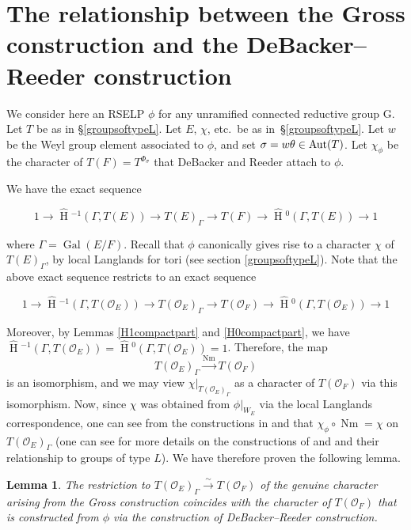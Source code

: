 \documentclass[11pt]{amsart}
\theoremstyle{plain}
\newtheorem{lemma}[theorem]{Lemma}
\newcommand{\HT}[1]{\hat{\HH}{}^{#1}}
\theoremstyle{definition}
\DeclareMathOperator{\Gal}{Gal}
\DeclareMathOperator{\HH}{H}
\DeclareMathOperator{\Nm}{Nm}
\begin{document}
\section{The relationship between the Gross construction and the DeBacker--Reeder construction}\label{grossdebackerreeder}

We consider here an RSELP $\phi$ for any unramified connected
reductive group G.  Let $T$ be as in \S\ref{groupsoftypeL}.  Let $E$,
$\chi$, etc.~be as in~\S\ref{groupsoftypeL}.  Let $w$ be the Weyl
group element associated to $\phi$, and set $\sigma = w \theta\in {\rm Aut}(T)$.
Let $\chi_{\phi}$ be the character of $T(F) = T^{\Phi_{\sigma}}$ that
DeBacker and Reeder attach to $\phi$.

We have the exact sequence

$$1 \rightarrow \HT{-1}(\Gamma, T(E)) \rightarrow T(E)_{\Gamma} \rightarrow T(F)
  \rightarrow \HT{0}(\Gamma, T(E)) \rightarrow 1$$

where $\Gamma = \Gal(E/F)$.  Recall that $\phi$ canonically gives
rise to a character $\chi$ of $T(E)_{\Gamma}$, by local Langlands
for tori (see section \ref{groupsoftypeL}).  Note that the above
exact sequence restricts to an exact sequence

$$1 \rightarrow \HT{-1}(\Gamma, T(\mathcal{O}_E)) \rightarrow T(\mathcal{O}_E)_{\Gamma}
  \rightarrow T(\mathcal{O}_F) \rightarrow \HT{0}(\Gamma, T(\mathcal{O}_E)) \rightarrow 1$$

Moreover, by Lemmas \ref{H1compactpart} and \ref{H0compactpart}, we have
$\HT{-1}(\Gamma, T(\mathcal{O}_E)) = \HT{0}(\Gamma, T(\mathcal{O}_E)) = 1$.
Therefore, the map
$$T(\mathcal{O}_E)_{\Gamma} \xrightarrow{\Nm} T(\mathcal{O}_F)$$
is an isomorphism, and we may view
$\chi|_{T(\mathcal{O}_E)_{\Gamma}}$ as a character of
$T(\mathcal{O}_F)$ via this isomorphism.  Now, since $\chi$ was
obtained from $\phi|_{W_E}$ via the local Langlands correspondence, one can see
from the constructions in \cite{debackerreeder} and \cite{reeder} that 
$\chi_{\phi} \circ \Nm = \chi$ on $T(\mathcal{O}_E)_{\Gamma}$ (one can see
\cite{adrianlansky} for more details on the constructions of 
\cite{debackerreeder} and \cite{reeder} and their relationship to groups of
type $L$).
We have therefore proven the following lemma.

\begin{lemma}\label{grossanddebackerreedercompatibility}
  The restriction to $T(\mathcal{O}_E)_{\Gamma} \xrightarrow{\sim} T(\mathcal{O}_F)$
  of the genuine character arising from the Gross construction
  coincides with the character of $T(\mathcal{O}_F)$ that is
  constructed from $\phi$ via the construction of DeBacker--Reeder
  construction.
\end{lemma}
\end{document}
